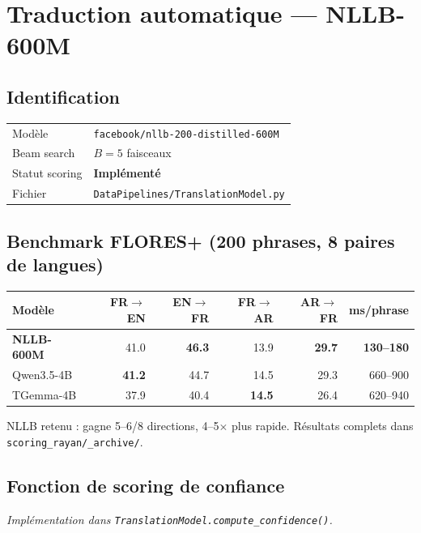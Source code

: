 \chapter{Traduction automatique --- NLLB-600M}

\section{Identification}

\begin{center}
\begin{tabular}{ll}
\toprule
Modèle         & \texttt{facebook/nllb-200-distilled-600M} \\
Beam search    & $B = 5$ faisceaux \\
Statut scoring & \textbf{Implémenté} \\
Fichier        & \texttt{DataPipelines/TranslationModel.py} \\
\bottomrule
\end{tabular}
\end{center}

\section{Benchmark FLORES+ (200 phrases, 8 paires de langues)}

\begin{center}
\begin{tabular}{lrrrrr}
\toprule
\textbf{Modèle} & FR$\to$EN & EN$\to$FR & FR$\to$AR & AR$\to$FR & ms/phrase \\
\midrule
\textbf{NLLB-600M} & 41.0 & \textbf{46.3} & 13.9 & \textbf{29.7} & \textbf{130--180} \\
Qwen3.5-4B & \textbf{41.2} & 44.7 & 14.5 & 29.3 & 660--900 \\
TGemma-4B  & 37.9 & 40.4 & \textbf{14.5} & 26.4 & 620--940 \\
\bottomrule
\end{tabular}
\end{center}

NLLB retenu : gagne 5--6/8 directions, 4--5$\times$ plus rapide.
Résultats complets dans \texttt{scoring\_rayan/\_archive/}.

\section{Fonction de scoring de confiance}

\noindent\textit{Implémentation dans \texttt{TranslationModel.compute\_confidence()}.}

